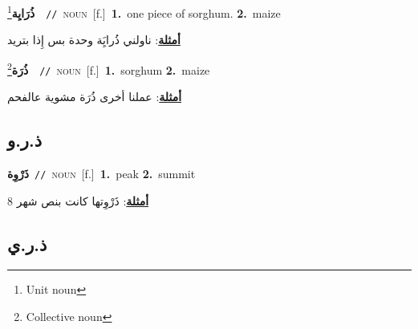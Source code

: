 \documentclass[10pt,a4paper,twoside]{article} %
\begin{document}
\begin{multicols}{2}
{{{\setlength\topsep{0pt}\textbf{\foreignlanguage{arabic}{ذُرَايِة}}\footnote{Unit noun}\ \ {\color{gray}\texttt{//}\color{black}}\ \textsc{noun}\ [f.]\ \textbf{1.}~one piece of sorghum.  \textbf{2.}~maize\  \begin{flushright}\color{gray}\foreignlanguage{arabic}{\textbf{\underline{\foreignlanguage{arabic}{أمثلة}}}: ناولني ذُرايَِة وحدة بس إِذا بتريد}\end{flushright}\color{black}} \vspace{2mm}

{\setlength\topsep{0pt}\textbf{\foreignlanguage{arabic}{ذُرَة}}\footnote{Collective noun}\ \ {\color{gray}\texttt{//}\color{black}}\ \textsc{noun}\ [f.]\ \textbf{1.}~sorghum  \textbf{2.}~maize\  \begin{flushright}\color{gray}\foreignlanguage{arabic}{\textbf{\underline{\foreignlanguage{arabic}{أمثلة}}}: عملنا  أخرى ذُرَة مشوية عالفحم}\end{flushright}\color{black}} \vspace{2mm}

\vspace{-3mm}
\subsection*{\color{blue}\foreignlanguage{arabic}{ذ.ر.و}\color{blue}{}} 

{\setlength\topsep{0pt}\textbf{\foreignlanguage{arabic}{ذَرْوِة}}\ {\color{gray}\texttt{//}\color{black}}\ \textsc{noun}\ [f.]\ \textbf{1.}~peak  \textbf{2.}~summit\  \begin{flushright}\color{gray}\foreignlanguage{arabic}{\textbf{\underline{\foreignlanguage{arabic}{أمثلة}}}: ذَرْوِتها كانت بنص شهر 8}\end{flushright}\color{black}} \vspace{2mm}

\vspace{-3mm}
\subsection*{\color{blue}\foreignlanguage{arabic}{ذ.ر.ي}\color{blue}{}} 

}}
\end{multicols}
\end{document}
